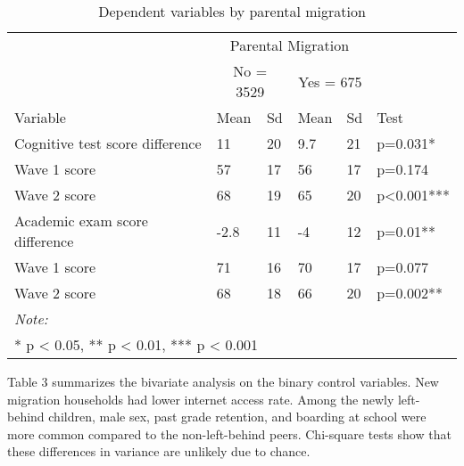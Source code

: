 \documentclass[
  man]{apa7}
\begin{document}
\begin{table}

\caption{\label{tab:tab-dpvar}Dependent variables by parental migration}
\centering
\begin{tabular}[t]{llllll}
\toprule
\multicolumn{1}{c}{ } & \multicolumn{4}{c}{Parental Migration} \\
\cmidrule(l{3pt}r{3pt}){2-5}
\multicolumn{1}{c}{ } & \multicolumn{2}{c}{No = 3529} & \multicolumn{2}{c}{Yes = 675} \\
\cmidrule(l{3pt}r{3pt}){2-3} \cmidrule(l{3pt}r{3pt}){4-5}
Variable & Mean & Sd & Mean & Sd & Test\\
\midrule
Cognitive test score difference & 11 & 20 & 9.7 & 21 & p=0.031*\\
\hspace{1em}Wave 1 score & 57 & 17 & 56 & 17 & p=0.174\\
\hspace{1em}Wave 2 score & 68 & 19 & 65 & 20 & p<0.001***\\
Academic exam score difference & -2.8 & 11 & -4 & 12 & p=0.01**\\
\hspace{1em}Wave 1 score & 71 & 16 & 70 & 17 & p=0.077\\
\addlinespace
\hspace{1em}Wave 2 score & 68 & 18 & 66 & 20 & p=0.002**\\
\bottomrule
\multicolumn{6}{l}{\rule{0pt}{1em}\textit{Note: }}\\
\multicolumn{6}{l}{\rule{0pt}{1em}* p < 0.05, ** p < 0.01, *** p < 0.001}\\
\end{tabular}
\end{table}

Table 3 summarizes the bivariate analysis on the binary control variables. New migration households had lower internet access rate. Among the newly left-behind children, male sex, past grade retention, and boarding at school were more common compared to the non-left-behind peers. Chi-square tests show that these differences in variance are unlikely due to chance.
\end{document}
